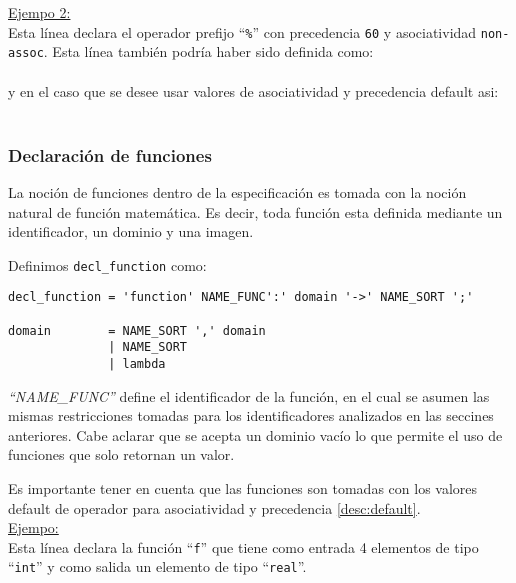 \underline{Ejempo 2:}\ \\
\vspace{0.2cm}
Esta línea declara el operador prefijo ``\texttt{\%}'' con precedencia \texttt{60} y asociatividad \texttt{non-assoc}. Esta línea también podría haber sido definida como:\\
\vspace{0.2cm}
\\
\vspace{0.2cm}
y en el caso que se desee usar valores de asociatividad y precedencia default asi:\\
\vspace{0.2cm}
\\

\subsubsection{Declaración de funciones}
La noción de funciones dentro de la especificación es tomada con la noción natural de función matemática. Es decir, toda función esta definida mediante un identificador, un dominio y una imagen.

Definimos \texttt{decl\_function} como:

\begin{center}
\lstset{language=inform}
\begin{lstlisting}
decl_function = 'function' NAME_FUNC':' domain '->' NAME_SORT ';'

domain        = NAME_SORT ',' domain
              | NAME_SORT 
              | lambda
\end{lstlisting}
\end{center}

\textit{``NAME\_FUNC''} define el identificador de la función, en el cual se asumen las mismas restricciones tomadas para los identificadores analizados en las seccines anteriores. Cabe aclarar que se acepta un dominio vacío lo que permite el uso de funciones que solo retornan un valor.

Es importante tener en cuenta que las funciones son tomadas con los valores default de operador para asociatividad y precedencia \ref{desc:default}.\\

\underline{Ejempo:}\ \\
\vspace{0.2cm}
Esta línea declara la función ``\texttt{f}'' que tiene como entrada 4 elementos de tipo ``\texttt{int}'' y como salida un elemento de tipo ``\texttt{real}''.\\

